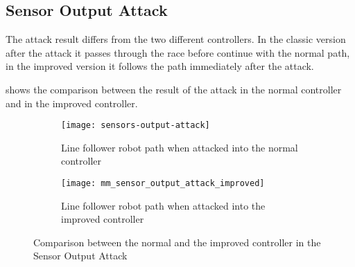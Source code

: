 \subsection{Sensor Output Attack}

The attack result differs from the two different controllers. In the classic
version after the attack it passes through the race before continue with the
normal path, in the improved version it follows the path immediately after the
attack.

 shows the comparison between the result
of the attack in the normal controller and in the improved controller.

\begin{figure}[htb]
	\centering
	\begin{subfigure}[b]{0.45\textwidth}
		\centering
		\texttt{[image: sensors-output-attack]}
		\caption{Line follower robot path when
		attacked into the normal controller}\label{fig:senoutatkresult}
	\end{subfigure}
	\hfill
	\begin{subfigure}[b]{0.45\textwidth}
		\centering
		\texttt{[image: mm\_sensor\_output\_attack\_improved]}
		\caption{Line follower robot path when
		attacked into the improved controller}\label{fig:senoutimpatkresult}
	\end{subfigure}
	\caption{Comparison between the normal and the improved controller in
	the Sensor Output Attack}\label{fig:sensoroutputattackresults}
\end{figure}

